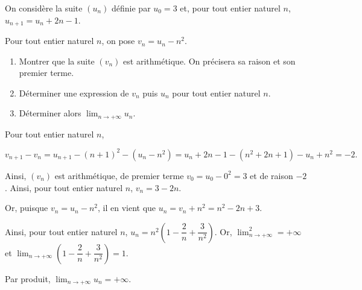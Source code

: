 \documentclass[11pt,fleqn]{book} %
\begin{document}
\begin{exercise}On considère la suite $(u_n)$ définie par $u_0=3$ et, pour tout entier naturel $n$, $u_{n+1}=u_n+2n-1$.

Pour tout entier naturel $n$, on pose $v_n=u_n-n^2$.
\begin{enumerate}
\item Montrer que la suite $(v_n)$ est arithmétique. On précisera sa raison et son premier terme.
\item Déterminer une expression de $v_n$ puis $u_n$ pour tout entier naturel $n$.
\item Déterminer alors $\displaystyle\lim_{n \to +\infty}u_n$.
\end{enumerate}\end{exercise}
\begin{solution}

Pour tout entier naturel $n$, 

\[v_{n+1}-v_n = u_{n+1}-(n+1)^2-(u_n-n^2)=u_n+2n-1-(n^2+2n+1)-u_n+n^2=-2.\]

Ainsi, $(v_n)$ est arithmétique, de premier terme $v_0=u_0-0^2=3$ et de raison $-2$. Ainsi, pour tout entier naturel $n$, $v_n=3-2n$.

Or, puisque $v_n=u_n-n^2$, il en vient que $u_n=v_n+n^2=n^2-2n+3$.

Ainsi, pour tout entier naturel $n$, $u_n = n^2 \left(1-\dfrac{2}{n}+\dfrac{3}{n^2}\right)$. Or, $\displaystyle\lim_{n \to +\infty}^2=+\infty$ et  $\displaystyle\lim_{n \to +\infty}\left(1-\dfrac{2}{n}+\dfrac{3}{n^2}\right)=1$. 

Par produit, $\displaystyle\lim_{n \to +\infty}u_n=+\infty$.\end{solution}
\end{document}
